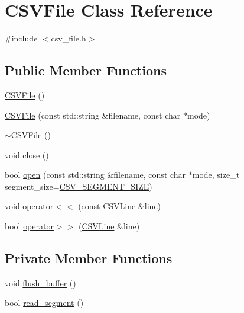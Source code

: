\hypertarget{classCSVFile}{}\section{C\+S\+V\+File Class Reference}
\label{classCSVFile}


{\ttfamily \#include $<$csv\+\_\+file.\+h$>$}

\subsection*{Public Member Functions}
\begin{DoxyCompactItemize}
\item 
\hyperlink{classCSVFile_af2bd30d331994368e6e308039da5aa98}{C\+S\+V\+File} ()
\item 
\hyperlink{classCSVFile_a4d51a07787223045f066920fd60bc8af}{C\+S\+V\+File} (const std\+::string \&filename, const char $\ast$mode)
\item 
\hyperlink{classCSVFile_a32ba16f45d8fb6c6eaed10dd174617c7}{$\sim$\+C\+S\+V\+File} ()
\item 
void \hyperlink{classCSVFile_a14bdfb97acae36e443355099a0038a3e}{close} ()
\item 
bool \hyperlink{classCSVFile_a0d43f229c3a7581451bef6e509e65f8f}{open} (const std\+::string \&filename, const char $\ast$mode, size\+\_\+t segment\+\_\+size=\hyperlink{csv__file_8h_ad397d5548431cda7e3459bd2d5ca0a0a}{C\+S\+V\+\_\+\+S\+E\+G\+M\+E\+N\+T\+\_\+\+S\+I\+Z\+E})
\item 
void \hyperlink{classCSVFile_a200a26b2e21bc62614e78fb37f4d8fea}{operator$<$$<$} (const \hyperlink{classCSVLine}{C\+S\+V\+Line} \&line)
\item 
bool \hyperlink{classCSVFile_a8f703896ad1b5f08bdd1c23f0aade6b7}{operator$>$$>$} (\hyperlink{classCSVLine}{C\+S\+V\+Line} \&line)
\end{DoxyCompactItemize}
\subsection*{Private Member Functions}
\begin{DoxyCompactItemize}
\item 
void \hyperlink{classCSVFile_ab2c05ddc80eeff819c9a5851b0f2a796}{flush\+\_\+buffer} ()
\item 
bool \hyperlink{classCSVFile_aeafe98fc0be504d50f0ce13de68cfed6}{read\+\_\+segment} ()
\end{DoxyCompactItemize}
